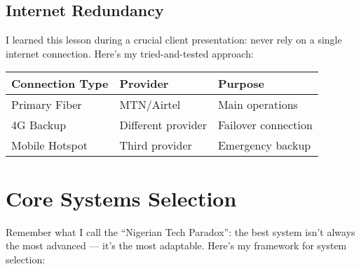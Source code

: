 \subsection{Internet Redundancy}\label{subsec:internet-redundancy}
I learned this lesson during a crucial client presentation: never rely on a single internet connection. Here's my tried-and-tested approach:

\begin{center}
\begin{tabularx}{\textwidth}{>{\raggedright\arraybackslash}X >{\centering\arraybackslash}X >{\raggedright\arraybackslash}X}
    \toprule
    \textbf{Connection Type} & \textbf{Provider} & \textbf{Purpose} \\
    \midrule
    Primary Fiber & MTN/Airtel & Main operations \\
    4G Backup & Different provider & Failover connection \\
    Mobile Hotspot & Third provider & Emergency backup \\
    \bottomrule
\end{tabularx}
\end{center}

\section{Core Systems Selection}\label{sec:core-systems}

Remember what I call the ``Nigerian Tech Paradox'': the best system isn't always the most advanced --- it's the most adaptable. Here's my framework for system selection:

